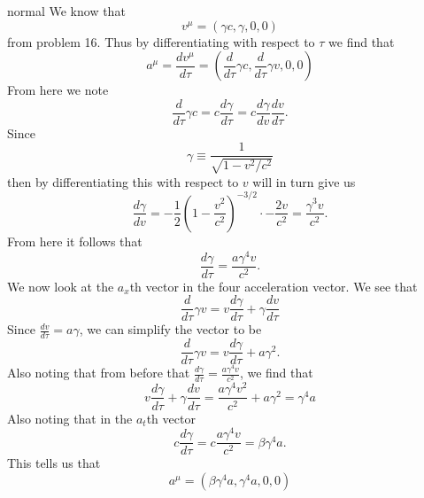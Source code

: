 \begin{solution}{normal}
We know that 
\[v^\mu = (\gamma c, \gamma , 0, 0)\]
from problem 16. Thus by differentiating with respect to $\tau$ we find that 
\[a^\mu = \frac{dv^\mu}{d\tau} = \left(\frac{d}{d\tau}\gamma c, \frac{d}{d\tau} \gamma v, 0, 0\right)\]
From here we note 
\[\frac{d}{d\tau}\gamma c = c\frac{d\gamma}{d\tau} = c\frac{d\gamma}{dv}\frac{dv}{d\tau}.\]
Since 
\[\gamma \equiv \frac{1}{\sqrt{1-v^2/c^2}}\]
then by differentiating this with respect to $v$ will in turn give us 
\[\frac{d\gamma}{dv} = -\frac{1}{2}\left(1 - \frac{v^2}{c^2}\right)^{-3/2} \cdot -\frac{2v}{c^2} = \frac{\gamma^3 v}{c^2}.\]
From here it follows that 
\[\frac{d\gamma}{d\tau} = \frac{a\gamma^4v}{c^2}.\]
We now look at the $a_x$th vector in the four acceleration vector. We see that 
\[\frac{d}{d\tau}\gamma v = v\frac{d\gamma}{d\tau} + \gamma\frac{dv}{d\tau}\]
Since $\frac{dv}{d\tau} = a\gamma$, we can simplify the vector to be 
\[\frac{d}{d\tau}\gamma v = v\frac{d\gamma}{d\tau} + a\gamma^2.\]
Also noting that from before that $\frac{d\gamma}{d\tau} = \frac{a\gamma^4v}{c^2}$, we find that 
\[v\frac{d\gamma}{d\tau} + \gamma\frac{dv}{d\tau} = \frac{a\gamma^4v^2}{c^2} + a\gamma^2 = \gamma^4a\]
Also noting that in the $a_t$th vector 
\[c\frac{d\gamma}{d\tau} = c\frac{a\gamma^4 v}{c^2} = \beta\gamma^4 a.\] 
This tells us that 
\[\boxed{a^\mu = (\beta\gamma^4 a, \gamma^4 a, 0, 0)}\]
\end{solution}